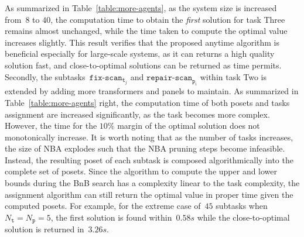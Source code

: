 As summarized in Table~\ref{table:more-agents},
as the system size is increased from~$8$ to $40$,
the computation time to obtain the \emph{first}
solution for task Three remains almost unchanged,
while the time taken to compute the optimal value increases slightly.
This result verifies that the proposed anytime algorithm is beneficial
especially for large-scale systems, as it can returns a high quality solution fast,
and close-to-optimal solutions can be returned as time permits.
Secondly, the subtasks~$\texttt{fix-scan}_{\texttt{t}_j}$ and $\texttt{repair-scan}_{\texttt{p}_i}$
within task Two is extended by adding more transformers and panels to maintain.
As summarized in Table~\ref{table:more-agents} right, the computation time of
both posets and tasks assignment are increased significantly, as the task becomes more
complex.
However, the time for the $10\%$ margin of the optimal solution does not monotonically
increase.
It is worth noting that as the number of tasks increases, the size of NBA explodes
such that the NBA pruning steps become infeasible.
Instead, the resulting poset of each subtask is composed algorithmically into the
complete set of posets.
Since the algorithm to compute the upper and lower bounds during the BnB search
has a complexity linear to the task complexity, the assignment algorithm
can still return the optimal value in proper time given the computed posets.
For example, for the extreme case of~$45$ subtasks when~$N_{\texttt{t}}=N_{\texttt{p}}=5$,
the first solution is found within~$0.58s$ while the close-to-optimal solution is
returned in~$3.26s$.



